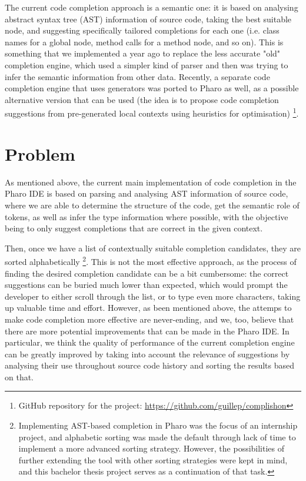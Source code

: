 The current code completion approach is a semantic one: it is based on analysing abstract syntax tree (AST) information of source code, taking the best suitable node, and suggesting specifically tailored completions for each one (i.e. class names for a global node, method calls for a method node, and so on). This is something that we implemented a year ago to replace the less accurate "old" completion engine, which used a simpler kind of parser and then was trying to infer the semantic information from other data. Recently, a separate code completion engine that uses generators was ported to Pharo as well, as a possible alternative version that can be used (the idea is to propose code completion suggestions from pre-generated local contexts using heuristics for optimisation) \footnote{GitHub repository for the project: \url{https://github.com/guillep/complishon}}.

\section{Problem}
\label{sec:Introduction-Problem}
As mentioned above, the current main implementation of code completion in the Pharo IDE is based on parsing and analysing AST information of source code, where we are able to determine the structure of the code, get the semantic role of tokens, as well as infer the type information where possible, with the objective being to only suggest completions that are correct in the given context.

Then, once we have a list of contextually suitable completion candidates, they are sorted alphabetically \footnote{Implementing AST-based completion in Pharo was the focus of an internship project, and alphabetic sorting was made the default through lack of time to implement a more advanced sorting strategy. However, the possibilities of further extending the tool with other sorting strategies were kept in mind, and this bachelor thesis project serves as a continuation of that task.}. This is not the most effective approach, as the process of finding the desired completion candidate can be a bit cumbersome: the correct suggestions can be buried much lower than expected, which would prompt the developer to either scroll through the list, or to type even more characters, taking up valuable time and effort. However, as been mentioned above, the attemps to make code completion more effective are never-ending, and we, too, believe that there are more potential improvements that can be made in the Pharo IDE. In particular, we think the quality of performance of the current completion engine can be greatly improved by taking into account the relevance of suggestions by analysing their use throughout source code history and sorting the results based on that.

